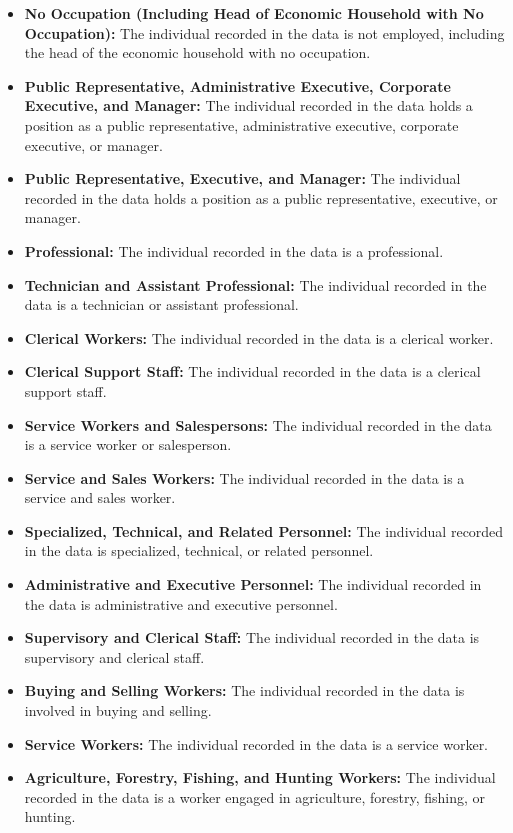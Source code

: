 \documentclass[twocolumn]{article}
\begin{document}
\begin{itemize}
    \item \textbf{No Occupation (Including Head of Economic Household with No Occupation):} The individual recorded in the data is not employed, including the head of the economic household with no occupation.
    \item \textbf{Public Representative, Administrative Executive, Corporate Executive, and Manager:} The individual recorded in the data holds a position as a public representative, administrative executive, corporate executive, or manager.
    \item \textbf{Public Representative, Executive, and Manager:} The individual recorded in the data holds a position as a public representative, executive, or manager.
    \item \textbf{Professional:} The individual recorded in the data is a professional.
    \item \textbf{Technician and Assistant Professional:} The individual recorded in the data is a technician or assistant professional.
    \item \textbf{Clerical Workers:} The individual recorded in the data is a clerical worker.
    \item \textbf{Clerical Support Staff:} The individual recorded in the data is a clerical support staff.
    \item \textbf{Service Workers and Salespersons:} The individual recorded in the data is a service worker or salesperson.
    \item \textbf{Service and Sales Workers:} The individual recorded in the data is a service and sales worker.
    \item \textbf{Specialized, Technical, and Related Personnel:} The individual recorded in the data is specialized, technical, or related personnel.
    \item \textbf{Administrative and Executive Personnel:} The individual recorded in the data is administrative and executive personnel.
    \item \textbf{Supervisory and Clerical Staff:} The individual recorded in the data is supervisory and clerical staff.
    \item \textbf{Buying and Selling Workers:} The individual recorded in the data is involved in buying and selling.
    \item \textbf{Service Workers:} The individual recorded in the data is a service worker.
    \item \textbf{Agriculture, Forestry, Fishing, and Hunting Workers:} The individual recorded in the data is a worker engaged in agriculture, forestry, fishing, or hunting.

\end{itemize}
\end{document}
